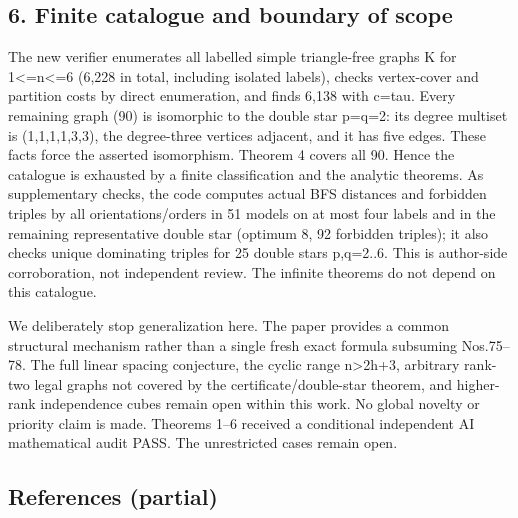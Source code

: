 \documentclass[
]{article}
\begin{document}
\subsection{6. Finite catalogue and boundary of
scope}\label{finite-catalogue-and-boundary-of-scope}

The new verifier enumerates all labelled simple triangle-free graphs K
for 1\textless=n\textless=6 (6,228 in total, including isolated labels),
checks vertex-cover and partition costs by direct enumeration, and finds
6,138 with c=tau. Every remaining graph (90) is isomorphic to the double
star p=q=2: its degree multiset is (1,1,1,1,3,3), the degree-three
vertices adjacent, and it has five edges. These facts force the asserted
isomorphism. Theorem 4 covers all 90. Hence the catalogue is exhausted
by a finite classification and the analytic theorems. As supplementary
checks, the code computes actual BFS distances and forbidden triples by
all orientations/orders in 51 models on at most four labels and in the
remaining representative double star (optimum 8, 92 forbidden triples);
it also checks unique dominating triples for 25 double stars p,q=2..6.
This is author-side corroboration, not independent review. The infinite
theorems do not depend on this catalogue.

We deliberately stop generalization here. The paper provides a common
structural mechanism rather than a single fresh exact formula subsuming
Nos.75--78. The full linear spacing conjecture, the cyclic range
n\textgreater2h+3, arbitrary rank-two legal graphs not covered by the
certificate/double-star theorem, and higher-rank independence cubes
remain open within this work. No global novelty or priority claim is
made. Theorems 1--6 received a conditional independent AI mathematical
audit PASS. The unrestricted cases remain open.

\subsection{References (partial)}\label{references-partial}
\end{document}
